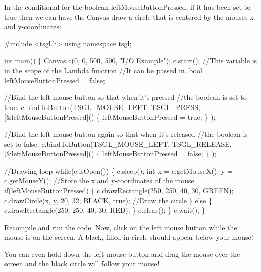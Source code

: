 In the conditional for the boolean {\ttfamily left\+Mouse\+Button\+Pressed}, if it has been set to {\ttfamily true} then we can have the Canvas draw a circle that is centered by the mouse\textquotesingle{}s x and y-\/coordinates\+:


\begin{DoxyCode}
\textcolor{preprocessor}{#include <tsgl.h>}
\textcolor{keyword}{using namespace }\hyperlink{namespacetsgl}{tsgl};

\textcolor{keywordtype}{int} main() \{
  \hyperlink{classtsgl_1_1_canvas}{Canvas} c(0, 0, 500, 500, \textcolor{stringliteral}{"I/O Example"});
  c.start();
  \textcolor{comment}{//This variable is in the scope of the Lambda function }
  \textcolor{comment}{//It can be passed in.}
  \textcolor{keywordtype}{bool} leftMouseButtonPressed = \textcolor{keyword}{false};

  \textcolor{comment}{//Bind the left mouse button so that when it's pressed}
  \textcolor{comment}{//the boolean is set to true.}
  c.bindToButton(TSGL\_MOUSE\_LEFT, TSGL\_PRESS, 
                    [&leftMouseButtonPressed]() \{
                          leftMouseButtonPressed = \textcolor{keyword}{true};
                    \}
                );

  \textcolor{comment}{//Bind the left mouse button again so that when it's released }
  \textcolor{comment}{//the boolean is set to false.}
  c.bindToButton(TSGL\_MOUSE\_LEFT, TSGL\_RELEASE, 
                    [&leftMouseButtonPressed]() \{
                          leftMouseButtonPressed = \textcolor{keyword}{false};
                    \}
                );

  \textcolor{comment}{//Drawing loop}
  \textcolor{keywordflow}{while}(c.isOpen()) \{
    c.sleep();
    \textcolor{keywordtype}{int} x = c.getMouseX(), y = c.getMouseY();  \textcolor{comment}{//Store the x and y-coordinates of the mouse}
    \textcolor{keywordflow}{if}(leftMouseButtonPressed) \{
      c.drawRectangle(250, 250, 40, 30, GREEN);
      c.drawCircle(x, y, 20, 32, BLACK, \textcolor{keyword}{true});  \textcolor{comment}{//Draw the circle}
    \} \textcolor{keywordflow}{else} \{
      c.drawRectangle(250, 250, 40, 30, RED);
    \}
    c.clear();
  \}
  c.wait();
\}
\end{DoxyCode}


Recompile and run the code. Now, click on the left mouse button while the mouse is on the screen. A black, filled-\/in circle should appear below your mouse!

You can even hold down the left mouse button and drag the mouse over the screen and the black circle will follow your mouse!

